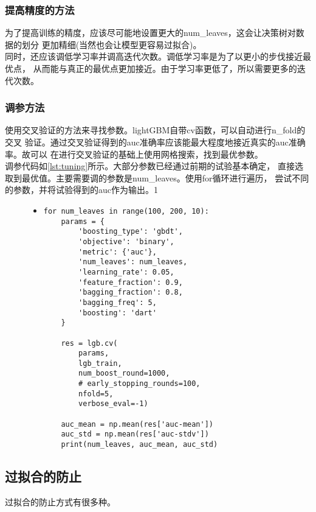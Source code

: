 \documentclass[a4paper]{article}
\begin{document}
\subsubsection{提高精度的方法}
为了提高训练的精度，应该尽可能地设置更大的num\_leaves，这会让决策树对数据的划分
更加精细(当然也会让模型更容易过拟合)。\\

同时，还应该调低学习率并调高迭代次数。调低学习率是为了以更小的步伐接近最优点，
从而能与真正的最优点更加接近。由于学习率更低了，所以需要更多的迭代次数。

\subsubsection{调参方法}
使用交叉验证的方法来寻找参数。lightGBM自带cv函数，可以自动进行n\_fold的交叉
验证。通过交叉验证得到的auc准确率应该能最大程度地接近真实的auc准确率。故可以
在进行交叉验证的基础上使用网格搜索，找到最优参数。\\

调参代码如\autoref{lst:tuning}所示。大部分参数已经通过前期的试验基本确定，
直接选取到最优值。主要需要调的参数是num\_leaves。使用for循环进行遍历，
尝试不同的参数，并将试验得到的auc作为输出。1

\begin{figure}[!hbt]
\begin{itemize}
\item[] \begin{lstlisting}[style=mypython, label=lst:tuning, caption=调参方法]
for num_leaves in range(100, 200, 10):
    params = {
        'boosting_type': 'gbdt',
        'objective': 'binary',
        'metric': {'auc'},
        'num_leaves': num_leaves,
        'learning_rate': 0.05,
        'feature_fraction': 0.9,
        'bagging_fraction': 0.8,
        'bagging_freq': 5,
        'boosting': 'dart'
    }

    res = lgb.cv(
        params, 
        lgb_train, 
        num_boost_round=1000, 
        # early_stopping_rounds=100,
        nfold=5,
        verbose_eval=-1)

    auc_mean = np.mean(res['auc-mean'])
    auc_std = np.mean(res['auc-stdv'])
    print(num_leaves, auc_mean, auc_std)
\end{lstlisting}
\end{itemize}
\end{figure}


\subsection{过拟合的防止}
过拟合的防止方式有很多种。
\end{document}
